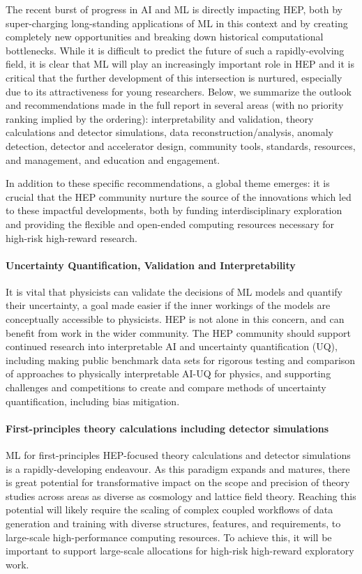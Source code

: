 \documentclass[submission,Phys]{SciPost}
\begin{document}
 The recent burst of progress in AI and ML is directly impacting HEP, both by super-charging long-standing applications of ML in this context and by creating completely new opportunities and breaking down historical computational bottlenecks. While it is difficult to predict the future of such a rapidly-evolving field, it is clear that ML will play an increasingly important role in HEP and it is critical that the further development of this intersection is nurtured, especially due to its attractiveness for young researchers.  Below, we summarize the outlook and recommendations made in the full report in several areas (with no priority ranking implied by the ordering): interpretability and validation, theory calculations and detector simulations, data reconstruction/analysis, anomaly detection, detector and accelerator design, community tools, standards, resources, and management, and education and engagement. 
 
 In addition to these specific recommendations, a global theme emerges:  it is crucial that the HEP community nurture the source of the innovations which led to these impactful developments, both by funding interdisciplinary exploration and providing the flexible and open-ended computing resources necessary for high-risk high-reward research.

\paragraph{Uncertainty Quantification, Validation and Interpretability}

It is vital that physicists can validate the decisions of ML models and quantify their uncertainty, a goal  made easier if the inner workings of the models are conceptually accessible to physicists. HEP is not alone in this concern, and can benefit from work in the wider community. 
The HEP community should support continued research into interpretable AI and uncertainty quantification (UQ), including  making public benchmark data sets for rigorous testing and comparison of approaches to physically interpretable AI-UQ for physics, and supporting challenges and competitions to create and compare methods of uncertainty quantification, including bias mitigation.

\paragraph{First-principles theory calculations including detector simulations}
ML for first-principles HEP-focused theory calculations and detector simulations is a rapidly-developing endeavour. As this paradigm expands and matures, there is great potential for transformative impact on the scope and precision of theory studies across areas as diverse as cosmology and lattice field theory. Reaching this potential will likely require the scaling of complex coupled workflows of data generation and training with diverse structures, features, and requirements, to large-scale high-performance computing resources. To achieve this, it will be important to support large-scale allocations for high-risk high-reward exploratory work.
\end{document}

